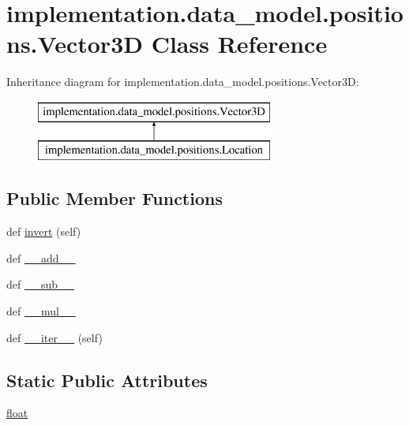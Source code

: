 \hypertarget{classimplementation_1_1data__model_1_1positions_1_1_vector3_d}{}\section{implementation.\+data\+\_\+model.\+positions.\+Vector3D Class Reference}
\label{classimplementation_1_1data__model_1_1positions_1_1_vector3_d}
Inheritance diagram for implementation.\+data\+\_\+model.\+positions.\+Vector3D\+:\begin{figure}[H]
\begin{center}
\leavevmode
\includegraphics[height=2.000000cm]{classimplementation_1_1data__model_1_1positions_1_1_vector3_d}
\end{center}
\end{figure}
\subsection*{Public Member Functions}
\begin{DoxyCompactItemize}
\item 
def \hyperlink{classimplementation_1_1data__model_1_1positions_1_1_vector3_d_a1f561acdb2feabd9f92441d27fac384c}{invert} (self)
\item 
def \hyperlink{classimplementation_1_1data__model_1_1positions_1_1_vector3_d_a606698a8b72c539e8d8bf3b37946d01f}{\+\_\+\+\_\+add\+\_\+\+\_\+}
\item 
def \hyperlink{classimplementation_1_1data__model_1_1positions_1_1_vector3_d_a7c1d2d39ec8d81ad5d571007cf27fb90}{\+\_\+\+\_\+sub\+\_\+\+\_\+}
\item 
def \hyperlink{classimplementation_1_1data__model_1_1positions_1_1_vector3_d_a1d4b507104453004f32a53274a7f961d}{\+\_\+\+\_\+mul\+\_\+\+\_\+}
\item 
def \hyperlink{classimplementation_1_1data__model_1_1positions_1_1_vector3_d_ad728a8b5918c160cc048f5d80e596da5}{\+\_\+\+\_\+iter\+\_\+\+\_\+} (self)
\end{DoxyCompactItemize}
\subsection*{Static Public Attributes}
\begin{DoxyCompactItemize}
\item 
\hyperlink{classimplementation_1_1data__model_1_1positions_1_1_vector3_d_abb66fd44140d7eb3a383cdf27685741f}{float}
\end{DoxyCompactItemize}


